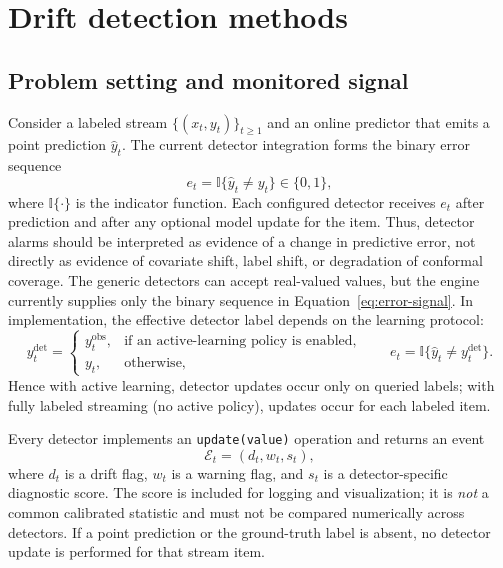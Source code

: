 \hypersetup{pageanchor=false}
\chapter{Drift detection methods}
\label{chap:drift-detectors}

\section{Problem setting and monitored signal}
\label{sec:detector-setting}

Consider a labeled stream $\{(x_t,y_t)\}_{t\geq1}$ and an online predictor that emits a point prediction $\hat y_t$. The current detector integration forms the binary error sequence
\begin{equation}
 e_t = \mathbb{I}\{\hat y_t \neq y_t\}\in\{0,1\},
 \label{eq:error-signal}
\end{equation}
where $\mathbb{I}\{\cdot\}$ is the indicator function. Each configured detector receives $e_t$ after prediction and after any optional model update for the item. Thus, detector alarms should be interpreted as evidence of a change in predictive error, not directly as evidence of covariate shift, label shift, or degradation of conformal coverage. The generic detectors can accept real-valued values, but the engine currently supplies only the binary sequence in Equation~\eqref{eq:error-signal}.
In implementation, the effective detector label depends on the learning protocol:
\begin{equation}
 y_t^{\mathrm{det}} =
 \begin{cases}
 y_t^{\mathrm{obs}}, & \text{if an active-learning policy is enabled,}\\
 y_t, & \text{otherwise,}
 \end{cases}
 \qquad
 e_t = \mathbb{I}\{\hat y_t \neq y_t^{\mathrm{det}}\}.
 \label{eq:error-signal-protocol}
\end{equation}
Hence with active learning, detector updates occur only on queried labels; with fully labeled streaming (no active policy), updates occur for each labeled item.

Every detector implements an \texttt{update(value)} operation and returns an event
\begin{equation}
 \mathcal{E}_t=(d_t,w_t,s_t),
\end{equation}
where $d_t$ is a drift flag, $w_t$ is a warning flag, and $s_t$ is a detector-specific diagnostic score. The score is included for logging and visualization; it is \emph{not} a common calibrated statistic and must not be compared numerically across detectors. If a point prediction or the ground-truth label is absent, no detector update is performed for that stream item.

